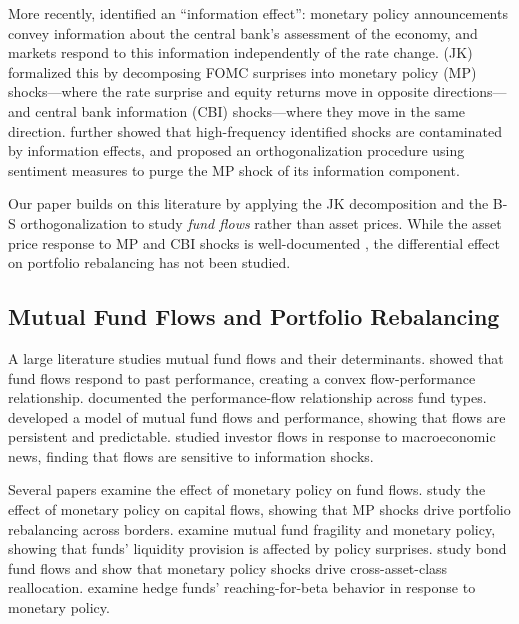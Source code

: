 \documentclass[11pt,a4paper]{article}
\begin{document}
More recently, \citet{nakamura2018high} identified an ``information effect'': monetary policy announcements convey information about the central bank's assessment of the economy, and markets respond to this information independently of the rate change. \citet{jarocinski2020deconstructing} (JK) formalized this by decomposing FOMC surprises into monetary policy (MP) shocks---where the rate surprise and equity returns move in opposite directions---and central bank information (CBI) shocks---where they move in the same direction. \citet{bauer2023reassessment} further showed that high-frequency identified shocks are contaminated by information effects, and proposed an orthogonalization procedure using sentiment measures to purge the MP shock of its information component.

Our paper builds on this literature by applying the JK decomposition and the B-S orthogonalization to study \textit{fund flows} rather than asset prices. While the asset price response to MP and CBI shocks is well-documented \citep{jarocinski2020deconstructing, bauer2023reassessment}, the differential effect on portfolio rebalancing has not been studied.

\subsection{Mutual Fund Flows and Portfolio Rebalancing}

A large literature studies mutual fund flows and their determinants. \citet{chevalier1997risk} showed that fund flows respond to past performance, creating a convex flow-performance relationship. \citet{sirri2004does} documented the performance-flow relationship across fund types. \citet{lou2012dynamics} developed a model of mutual fund flows and performance, showing that flows are persistent and predictable. \citet{goldstein2017investor} studied investor flows in response to macroeconomic news, finding that flows are sensitive to information shocks.

Several papers examine the effect of monetary policy on fund flows. \citet{ciminelli2022monetary} study the effect of monetary policy on capital flows, showing that MP shocks drive portfolio rebalancing across borders. \citet{fecht2026mutual} examine mutual fund fragility and monetary policy, showing that funds' liquidity provision is affected by policy surprises. \citet{blanco2025bond} study bond fund flows and show that monetary policy shocks drive cross-asset-class reallocation. \citet{abdi2024monetary} examine hedge funds' reaching-for-beta behavior in response to monetary policy.
\end{document}
